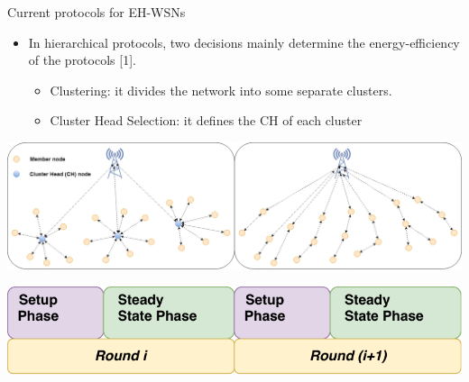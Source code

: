 \documentclass{beamer}
\begin{document}
\begin{frame}[t]{Current protocols for EH-WSNs} %
\small
\begin{itemize}
\justifying
\item In hierarchical protocols, two decisions mainly determine the energy-efficiency of the protocols [1].
	\begin{itemize}
	\item Clustering: it divides the network into some separate clusters.
	\item Cluster Head Selection: it defines the CH of each cluster
	\end{itemize}
\end{itemize}

\begin{center}
\includegraphics[scale=0.19]{figure/FlatHier}
\end{center}

\begin{center}
\includegraphics[scale=0.45]{figure/Phase}
\end{center}

\end{frame}
\end{document}
